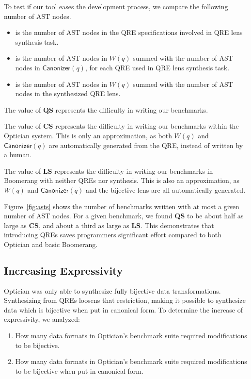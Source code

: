 \documentclass[acmsmall,review,anonymous]{acmart}
\newcommand{\kw}[1]{\ensuremath{\mathsf{#1}}}
\newcommand{\canonizer}{\ensuremath{\kw{Canonizer}}}
\newcommand{\QRESize}{\textbf{QS}}
\newcommand{\CanonizerAndSpecSize}{\textbf{CS}}
\newcommand{\LensAndSpecSize}{\textbf{LS}}
\begin{document}
To test if our tool eases the development process, we compare the following
number of AST nodes.
%
\begin{itemize}
  \item[\QRESize{}] is the number of AST nodes in the QRE
  specifications involved in QRE lens synthesis task.
  \item[\CanonizerAndSpecSize{}] is the number of
  AST nodes in $W(q)$ summed with the number of AST nodes in $\canonizer(q)$,
  for each QRE used in QRE lens synthesis task.
  \item[\LensAndSpecSize{}] is the number of AST nodes
  in $W(q)$ summed with the number of AST nodes in the synthesized QRE lens.
\end{itemize}

The value of \QRESize{} represents the difficulty in writing our benchmarks.

The value of \CanonizerAndSpecSize{} represents the difficulty in writing our
benchmarks within the Optician system. This is only an approximation, as both
$W(q)$ and $\canonizer(q)$ are automatically generated from the QRE, instead of
written by a human.

The value of \LensAndSpecSize{} represents the difficulty in writing our
benchmarks in Boomerang with neither QREs nor synthesis. This is also an
approximation, as $W(q)$ and $\canonizer(q)$ and the bijective lens are all
automatically generated.

Figure~\ref{fig:asts} shows the number of benchmarks written with at most a
given number of AST nodes. For a given benchmark, we found \QRESize{} to be
about half as large as \CanonizerAndSpecSize, and about a third as large as
\LensAndSpecSize{}. This demonstrates that introducing QREs saves programmers
significant effort compared to both Optician and basic Boomerang.

\subsection{Increasing Expressivity}

Optician was only able to synthesize fully bijective data transformations.
Synthesizing from QREs loosens that restriction, making it possible to
synthesize data which is bijective when put in canonical form. To determine the
increase of expressivity, we analyzed:
\begin{enumerate}
  \item How many data formats in Optician's benchmark suite required modifications
  to be bijective.
  \item How many data formats in Optician's benchmark suite required modifications
  to be bijective when put in canonical form.
\end{enumerate}
\end{document}
